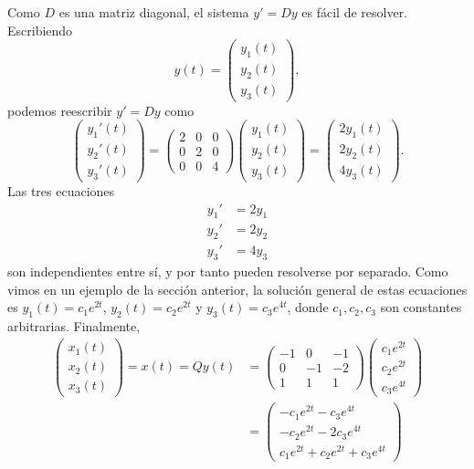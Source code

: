 \documentclass[12pt,a4paper]{book}
\begin{document}
    Como $D$ es una matriz diagonal, el sistema $y'=Dy$ es fácil de resolver. Escribiendo
    \begin{equation*}
        y(t)=\begin{pmatrix}y_1(t)\\y_2(t)\\y_3(t)\end{pmatrix},
    \end{equation*}
    podemos reescribir $y'=Dy$ como
    \begin{equation*}
        \begin{pmatrix}y_1'(t)\\y_2'(t)\\y_3'(t)\end{pmatrix}=\begin{pmatrix}2&0&0\\0&2&0\\0&0&4\end{pmatrix}\begin{pmatrix}y_1(t)\\y_2(t)\\y_3(t)\end{pmatrix}=\begin{pmatrix}2y_1(t)\\2y_2(t)\\4y_3(t)\end{pmatrix}.
    \end{equation*}
    Las tres ecuaciones
    \begin{align*}
        y_1'&=2y_1\\
        y_2'&=2y_2\\
        y_3'&=4y_3
    \end{align*}
    son independientes entre sí, y por tanto pueden resolverse por separado. Como vimos en un ejemplo de la sección anterior, la solución general de estas ecuaciones es $y_1(t)=c_1e^{2t}$, $y_2(t)=c_2e^{2t}$ y $y_3(t)=c_3e^{4t}$, donde $c_1,c_2,c_3$ son constantes arbitrarias. Finalmente,
    \begin{align*}
        \begin{pmatrix}x_1(t)\\x_2(t)\\x_3(t)\end{pmatrix}=x(t)=Qy(t)&=\begin{pmatrix}-1&0&-1\\0&-1&-2\\1&1&1\end{pmatrix}\begin{pmatrix}c_1e^{2t}\\c_2e^{2t}\\c_3e^{4t}\end{pmatrix}\\
        &=\begin{pmatrix}-c_1e^{2t}-c_3e^{4t}\\-c_2e^{2t}-2c_3e^{4t}\\c_1e^{2t}+c_2e^{2t}+c_3e^{4t}\end{pmatrix}
    \end{align*}
\end{document}
